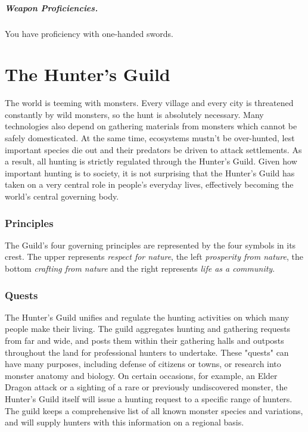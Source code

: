 \paragraph{Weapon Proficiencies.} You have proficiency with one-handed swords.

{}



\chapter{The Hunter's Guild}


The world is teeming with monsters. Every village and every city is threatened constantly by wild monsters, so the hunt is absolutely necessary. Many technologies also depend on gathering materials from monsters which cannot be safely domesticated. At the same time, ecosystems mustn't be over-hunted, lest important species die out and their predators be driven to attack settlements. As a result, all hunting is strictly regulated through the Hunter's Guild. Given how important hunting is to society, it is not surprising that the Hunter's Guild has taken on a very central role in people's everyday lives, effectively becoming the world's central governing body.

\subsection{Principles}
The Guild's four governing principles are represented by the four symbols in its crest. The upper represents \textit{respect for nature}, the left \textit{prosperity from nature}, the bottom \textit{crafting from nature} and the right represents \textit{life as a community}.

\subsection{Quests}
The Hunter's Guild unifies and regulate the hunting activities on which many people make their living. The guild aggregates hunting and gathering requests from far and wide, and posts them within their gathering halls and outposts throughout the land for professional hunters to undertake. These "quests" can have many purposes, including defense of citizens or towns, or research into monster anatomy and biology. On certain occasions, for example, an Elder Dragon attack or a sighting of a rare or previously undiscovered monster, the Hunter's Guild itself will issue a hunting request to a specific range of hunters. The guild keeps a comprehensive list of all known monster species and variations, and will supply hunters with this information on a regional basis.

